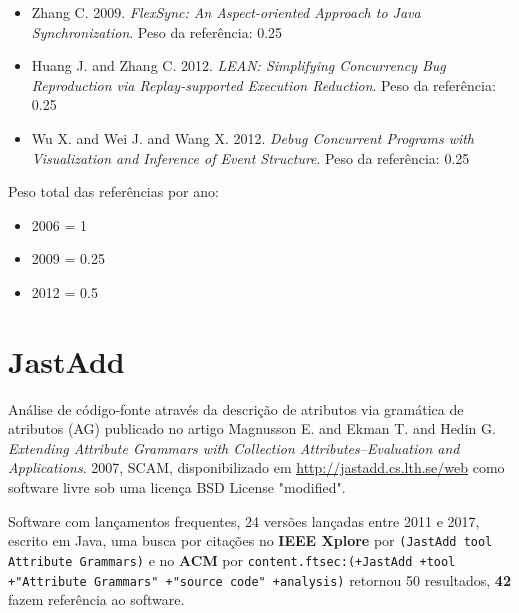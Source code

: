 \begin{itemize}
\item Zhang C.
      2009.
      {\it FlexSync: An Aspect-oriented Approach to Java Synchronization}.
      Peso da referência: 0.25
\item Huang J. and Zhang C.
      2012.
      {\it LEAN: Simplifying Concurrency Bug Reproduction via Replay-supported Execution Reduction}.
      Peso da referência: 0.25
\item Wu X. and Wei J. and Wang X.
      2012.
      {\it Debug Concurrent Programs with Visualization and Inference of Event Structure}.
      Peso da referência: 0.25
\end{itemize}

Peso total das referências por ano:

\begin{itemize}
\item 2006 = 1
\item 2009 = 0.25
\item 2012 = 0.5
\end{itemize}


\section{JastAdd}

Análise de código-fonte através da descrição de atributos via gramática de atributos (AG)
publicado no artigo
Magnusson E. and Ekman T. and Hedin G.
{\it Extending Attribute Grammars with Collection Attributes--Evaluation and Applications}.
2007,
SCAM,
disponibilizado em \url{http://jastadd.cs.lth.se/web}
como software livre
sob uma licença BSD License "modified".

Software com lançamentos frequentes,
24 versões lançadas
entre 2011 e 2017,
escrito em Java,
uma busca por citações no {\bf IEEE Xplore} por
\texttt{(JastAdd tool Attribute Grammars)}
e no {\bf ACM} por
\texttt{content.ftsec:(+JastAdd +tool +"Attribute Grammars" +"source code" +analysis)}
retornou
50 resultados,
{\bf 42} fazem referência ao software.

